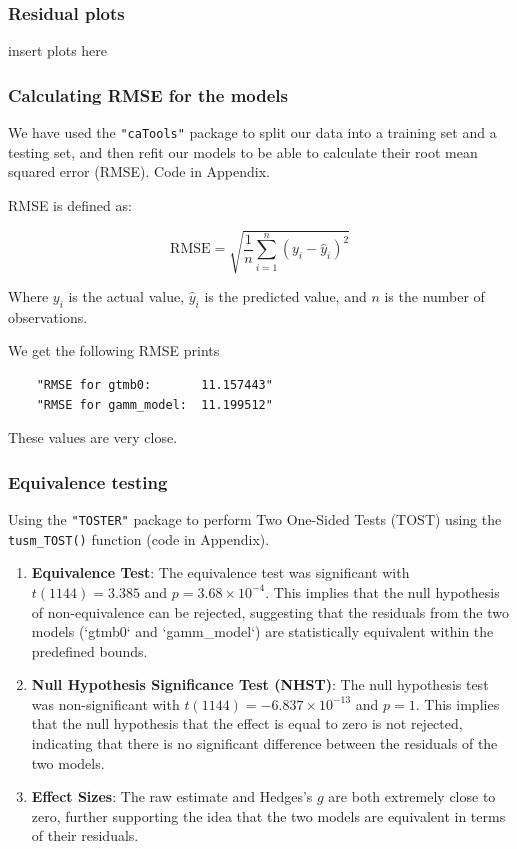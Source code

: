 \subsubsection{Residual plots}

insert plots here

\subsubsection{Calculating RMSE for the models}

We have used the \texttt{"caTools"} package to split our data into a training set and a testing set, and then refit our models to be able to calculate their root mean squared error (RMSE). Code in Appendix. 
\newline

 RMSE is defined as:

\[
\text{RMSE} = \sqrt{\frac{1}{n} \sum_{i=1}^{n} (y_i - \hat{y}_i)^2}
\]

Where \(y_i\) is the actual value, \(\hat{y}_i\) is the predicted value, and \(n\) is the number of observations.
\newline

We get the following RMSE prints 

\begin{verbatim}
    "RMSE for gtmb0:       11.157443"
    "RMSE for gamm_model:  11.199512"
\end{verbatim}

These values are very close. 

\subsubsection{Equivalence testing}

Using the \texttt{"TOSTER"} package to perform Two One-Sided Tests (TOST) using the \texttt{tusm\_TOST()} function (code in Appendix). 
\newline

\begin{enumerate}
    \item \textbf{Equivalence Test}: The equivalence test was significant with \( t(1144) = 3.385 \) and \( p = 3.68 \times 10^{-4} \). This implies that the null hypothesis of non-equivalence can be rejected, suggesting that the residuals from the two models (`gtmb0` and `gamm\_model`) are statistically equivalent within the predefined bounds.
    
    \item \textbf{Null Hypothesis Significance Test (NHST)}: The null hypothesis test was non-significant with \( t(1144) = -6.837 \times 10^{-13} \) and \( p = 1 \). This implies that the null hypothesis that the effect is equal to zero is not rejected, indicating that there is no significant difference between the residuals of the two models.
    
    \item \textbf{Effect Sizes}: The raw estimate and Hedges's \( g \) are both extremely close to zero, further supporting the idea that the two models are equivalent in terms of their residuals.
\end{enumerate}

